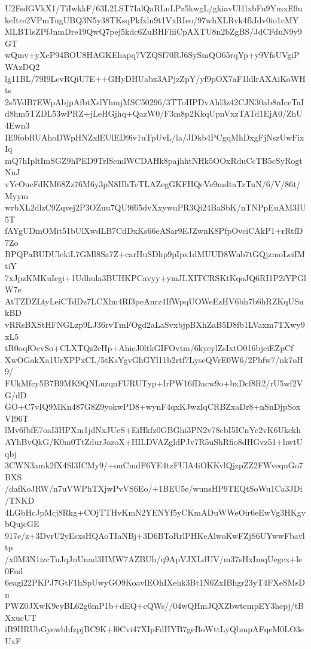 U2FsdGVkX1/TiIwkkF/63L2LST7IalQaRLuLPz5kwgL/gkiavUl1lxbFn9YmxE9u
keItre2VPmTugUBQ3N5y38TKsqPkfxln9t1VxRIeo/97whXLRvk4fkIdv0io1cMY
MLBTlsZPfJnmDre19QwQ7pej5kdc6ZuBHFliiCpAXTU8n2bZgBS/JdCFduN9y9GT
wQmv+yXeP94BOU8HAGKEhapq7VZQSf70RJ6SySmQO65rqYp+y9VfsUVgiPWAzDQ2
lg11BL/79I9LcvRQiU7E++GHyDHUabx3APjzZpY/yf9pOX7aF1ldlrAXAiKoWHts
2s5VdB7EWpAbjpAfbtXslYhmjMSC50296/3TToHPDvAhl3z42CJN30ab8nIceTaI
d8hm5TZDL53wPRZ+jLeHGjhq+QazW0/F3m8p2KkqUpnVxzTATd1EjA0/ZhU4Ewn3
IE9fobRUAhoDWpHNZxlEUlED9iv1uTpUvL/la/JDkb4PCgqMhDxgFjNszUwFixIq
mQ7hIpltImSGZ9hPED9TrlSemlWCDAHk8pajhhtNHk5OOxRduCcTB5cSyRogtNnJ
vYcOueFdKM68Zz76M6y3pN8HhTeTLAZegGKFHQcVe9mdtaTzTnN/6/V/86t/Myym
wrbXL2dlzC9Zqvej2P3OZuu7QU9f65dvXxywuPR3Qi24BaSbK/nTNPpEuAM3IU5T
fAYgUDmOMit51bUlXwdLB7CdDxKs66eASar9EJZwnK8PfpOvciCAkP1+rRtfD7Zo
BPQPaBUDUlekiL7GMl8Sa7Z+carHuSDhp9pIpx1dMUUD8Wnb7tGQjzmoLeiIMtiY
7xJpzKMKuIegi+1Udhula3BUHKPCavyy+ymJLXITCRSKtKqoJQ6RI1P2iYPGlW7e
AtTZDZLtyLeiCTdDz7LCXlm4Rf3peAnrz4IfWpqUOWeEzHV6bh7b6hRZKqUSukBD
vRRsBXStHFNGLzp9LJ36rvTmFOgd2aLaSvxbjpBXhZaB5D8fb1LVaxm7TXwy9xL5
tR0oqfOcvSo+CLXTQs2cHp+AhieJ0ltkGIFOvtm/6kyeylZsIxtO016bjciEZpCf
XwOGakXa1UrXPPxCL/5tKsYgvGhGYl11b2rtf7LyseQVrE0W6/2Pbfw7/nk7oH9/
FUkMfcy5B7B9MK9QNLuzqnFURUTyp+IrPW16fDacw9o+bxDcf8R2/rU5wf2VG/dD
GO+C7vIQ9MKn487G8Z9yokwPD8+wynF4qxKJwzIqCRBZxaDr8+nSnDjpSoxVI96T
lMv6fbfE7oaI3HPXm1jdNxJUeS+EiHkfz0GBGhi3PN2v78cbI5ICnYe2vK6Ukckh
AYhBvQkG/K0m0TtZdurJozoX+HILDVAZgldPJv7R5uShRfio8dHGvz51+hwtUqbj
3CWN3amk2fX4Sl3ICMy9/+ouCmdF6YE4tzFUlA4iOKKvlQjzpZZ2FWveqnGo7BXS
/dafKoJRW/n7uVWPhTXjwPvVS6Eo/+1BEU5e/wunsHP9TEQtSoWu1Ca3JDi/TNKD
4LGbHcJpMcj8Rkg+COjTTHvKmN2YENYf5yCKmADuWWeOir6eEwVg3HKgvbQujcGE
917e/z+3DvrU2yEsxsHQAoTIaNBj+3D6BToRrlPHKeAlwoKwFZjS6UYwwFbavltp
/x0M3N1izcTuJqJnUnad3HMW7AZBUh/q9ApVJXLdUV/m37sHxImqUegex+le0Fud
6eagi22PKPJ7GtF1hSpUwyGO9KoavlEOhIXehk3Bt1N6ZxIBhgr23yT4FXeSMsDn
PWZ0JXwK9eyBL62g6mP1b+dEQ+cQWs//04wQHmJQXZbwtempEY3hepj/tBXxucUT
iB9HRUbGyewbhfzpjBC9K+l0Cvi47XIpFdHYB7geBoWttLyQbmpAFqeM0LO3eUxF

